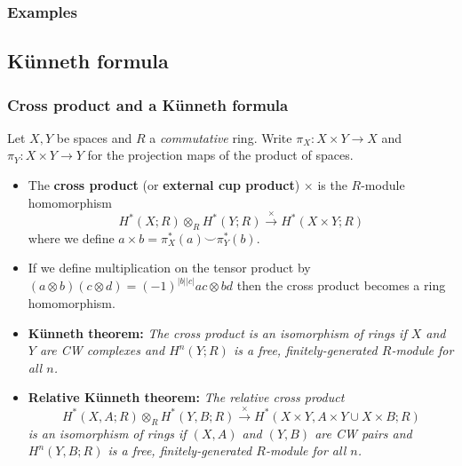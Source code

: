 \documentclass[10pt]{article}
\begin{document}
            \subsubsection{Examples}


        \subsection{Künneth formula}

            \subsubsection{Cross product and a Künneth formula}

                Let $X,Y$ be spaces and $R$ a \emph{commutative} ring.
                Write $\pi_X\colon X\times Y\to X$ and $\pi_Y\colon X\times Y\to Y$ for the projection maps of the product of spaces.

                \begin{itemize}
                    \item The \textbf{cross product} (or \textbf{external cup product}) $\times$ is the $R$-module homomorphism
                        \begin{equation*}
                            H^*(X;R)\otimes_R H^*(Y;R)\xrightarrow{\times}H^*(X\times Y;R)
                        \end{equation*}
                        where we define $a\times b = \pi_X^*(a)\smallsmile\pi_Y^*(b)$.
                    \item If we define multiplication on the tensor product by $(a\otimes b)(c\otimes d)=(-1)^{|b||c|}ac\otimes bd$ then the cross product becomes a ring homomorphism.
                    \item \textbf{Künneth theorem:} \emph{The cross product is an isomorphism of rings if $X$ and $Y$ are CW complexes and $H^n(Y;R)$ is a free, finitely-generated $R$-module for all $n$.}
                    \item \textbf{Relative Künneth theorem:} \emph{The relative cross product}
                        \begin{equation*}
                            H^*(X,A;R)\otimes_R H^*(Y,B;R)\xrightarrow{\times}H^*(X\times Y, A\times Y\cup X\times B;R)
                        \end{equation*}
                        \emph{is an isomorphism of rings if $(X,A)$ and $(Y,B)$ are CW pairs and $H^n(Y,B;R)$ is a free, finitely-generated $R$-module for all $n$.}
                \end{itemize}
\end{document}
